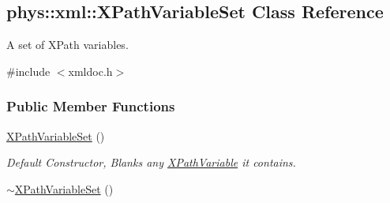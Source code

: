 \hypertarget{classphys_1_1xml_1_1XPathVariableSet}{
\subsection{phys::xml::XPathVariableSet Class Reference}
\label{df/dd1/classphys_1_1xml_1_1XPathVariableSet}
}


A set of XPath variables.  




{\ttfamily \#include $<$xmldoc.h$>$}

\subsubsection*{Public Member Functions}
\begin{DoxyCompactItemize}
\item 
\hypertarget{classphys_1_1xml_1_1XPathVariableSet_a34733feeb7720d30c2a752f6f9cd6858}{
\hyperlink{classphys_1_1xml_1_1XPathVariableSet_a34733feeb7720d30c2a752f6f9cd6858}{XPathVariableSet} ()}
\label{df/dd1/classphys_1_1xml_1_1XPathVariableSet_a34733feeb7720d30c2a752f6f9cd6858}

\begin{DoxyCompactList}\small\item\em Default Constructor, Blanks any \hyperlink{classphys_1_1xml_1_1XPathVariable}{XPathVariable} it contains. \item\end{DoxyCompactList}\item 
\hypertarget{classphys_1_1xml_1_1XPathVariableSet_af9ac0b922e9399a30ee81a59eb44e464}{
\hyperlink{classphys_1_1xml_1_1XPathVariableSet_af9ac0b922e9399a30ee81a59eb44e464}{$\sim$XPathVariableSet} ()}
\label{df/dd1/classphys_1_1xml_1_1XPathVariableSet_af9ac0b922e9399a30ee81a59eb44e464}


\end{DoxyCompactItemize}
